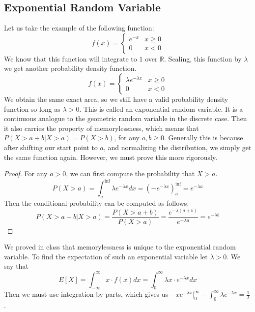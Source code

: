 \documentclass{article}
\theoremstyle{definition}
\begin{document}
    \subsection{Exponential Random Variable}
        Let us take the example of the following function:
        \[
            f(x) = \begin{cases}
                e^{-x} & x \geq 0\\
                0 & x < 0
            \end{cases}
        \]
        We know that this function will integrate to $1$ over $\mathbb{R}$.
        Scaling, this function by $\lambda$ we get another probability density function.
        \[ f(x) = \begin{cases}\lambda e^{-\lambda x} & x \geq 0\\ 0 & x < 0 \end{cases}\]
        We obtain the same exact area, so we still have a valid probability density function so
        long as $\lambda > 0$.
        This is called an exponential random variable.
        It is a continuous analogue to the geometric random variable in the discrete case. Then
        it also carries the property of memorylessness, which means that $P(X > a + b | X > a) = P(X > b)$,
        for any $a,b \geq 0$. Generally this is because after shifting our start point to $a$, and normalizing the distribution,
        we simply get the same function again. However, we must prove this more rigorously.
        \begin{proof}
            For any $a > 0$, we can first compute the probability that $X > a$.
            \[
                P(X > a) = \int_a^{\inf} \lambda e^{- \lambda x} dx = (-e^{-\lambda x})_a^{\inf} = e^{-\lambda a}
            \]
            Then the conditional probability can be computed as follows:
            \[
                P(X > a + b | X > a) = \frac{P(X > a + b)}{P(X > a)} = \frac{e^{-\lambda (a + b)}}{e^{-\lambda a}} = e^{-\lambda b}
            \]
        \end{proof}
        We proved in class that memorylessness is unique to the exponential random variable.
        To find the expectation of such an exponential variable let $\lambda > 0$. We say that 
        \[
            E[X] = \int_{-\infty}^\infty x \cdot f(x) dx = \int_0^\infty \lambda x \cdot e^{-\lambda x}dx
        \]
        Then we must use integration by parts, which gives us $-xe^{-\lambda x}\bigg|_0^\infty - \int_0^\infty \lambda e^{-\lambda x} = \frac{1}{\lambda}$.
\end{document}
